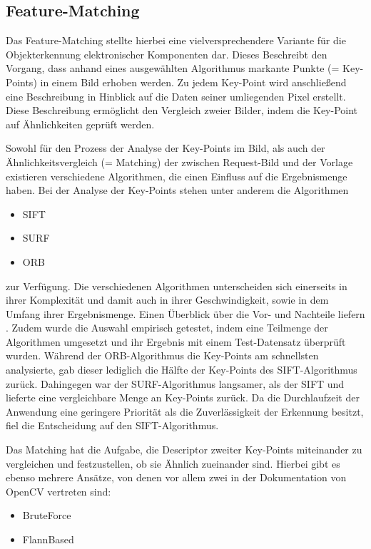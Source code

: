 \documentclass[
    type=Projektarbeit,
    status=draft, %
    language=german, %
    bibengine=bibtex,
]{unibwm-inf-thesis}
\begin{document}
    \subsection{Feature-Matching}
    Das Feature-Matching stellte hierbei eine vielversprechendere Variante für die Objekterkennung elektronischer Komponenten dar.
    Dieses Beschreibt den Vorgang, dass anhand eines ausgewählten Algorithmus markante Punkte (= Key-Points) in einem Bild erhoben werden.
    Zu jedem Key-Point wird anschließend eine Beschreibung in Hinblick auf die Daten seiner umliegenden Pixel erstellt.
    Diese Beschreibung ermöglicht den Vergleich zweier Bilder, indem die Key-Point auf Ähnlichkeiten geprüft werden.\cite{CV2FeatureMathing2022}

    Sowohl für den Prozess der Analyse der Key-Points im Bild, als auch der Ähnlichkeitsvergleich (= Matching) der zwischen Request-Bild und der Vorlage
    existieren verschiedene Algorithmen, die einen Einfluss auf die Ergebnismenge haben.
    Bei der Analyse der Key-Points stehen unter anderem die Algorithmen
    \begin{itemize}
        \item SIFT
        \item SURF
        \item ORB
    \end{itemize}
    zur Verfügung.
    Die verschiedenen Algorithmen unterscheiden sich einerseits in ihrer Komplexität und damit auch in ihrer Geschwindigkeit, sowie in dem Umfang ihrer Ergebnismenge.
    Einen Überblick über die Vor- und Nachteile liefern \citet{Karami2017}.
    Zudem wurde die Auswahl empirisch getestet, indem eine Teilmenge der Algorithmen umgesetzt und ihr Ergebnis mit einem Test-Datensatz überprüft wurden.
    Während der ORB-Algorithmus die Key-Points am schnellsten analysierte, gab dieser lediglich die Hälfte der Key-Points des SIFT-Algorithmus zurück.
    Dahingegen war der SURF-Algorithmus langsamer, als der SIFT und lieferte eine vergleichbare Menge an Key-Points zurück.
    Da die Durchlaufzeit der Anwendung eine geringere Priorität als die Zuverlässigkeit der Erkennung besitzt, fiel die Entscheidung auf den SIFT-Algorithmus.

    Das Matching hat die Aufgabe, die Descriptor zweiter Key-Points miteinander zu vergleichen und festzustellen, ob sie Ähnlich zueinander sind.
    Hierbei gibt es ebenso mehrere Ansätze, von denen vor allem zwei in der Dokumentation von OpenCV vertreten sind:
    \begin{itemize}
        \item BruteForce
        \item FlannBased
    \end{itemize}
\end{document}
